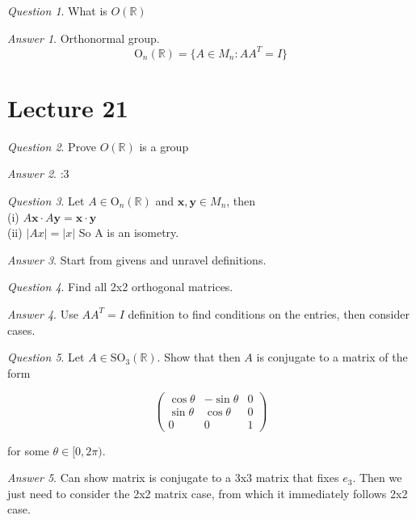 \documentclass[]{article}
\def\bx{\mathbf x}
\def\by{\mathbf y}
\def\reals{\mathbb{R}}
\theoremstyle{remark}
\theoremstyle{qnstyle}
\newtheorem{question}{Question}
\theoremstyle{answerstyle}
\newtheorem*{answer}{Answer}
\begin{document}
\begin{question}
    What is $O(\mathbb{R})$
\end{question}
\begin{answer}
    Orthonormal group. $$\text{O}_n(\mathbb{R}) = \{A \in M_n: A A^T = I\}$$
\end{answer}








\section* {Lecture 21}

\begin{question}
    Prove $O(\mathbb{R})$ is a group
\end{question}
\begin{answer}
    :3
\end{answer}

\begin{question}
    Let $A \in \text{O}_n(\mathbb{R})$ and $\bx, \by \in M_n$, then \\
    (i) $A\bx \cdot A\by = \bx \cdot \by$\\
    (ii) $|Ax| = |x|$
    So A is an isometry.
\end{question}
\begin{answer}
    Start from givens and unravel definitions.
\end{answer}

\begin{question}
    Find all 2x2 orthogonal matrices.
\end{question}
\begin{answer}
    Use $AA^T = I$ definition to find conditions on the entries, then consider cases.
\end{answer}

\begin{question}
    Let $A \in \text{SO}_3(\reals)$. Show that then $A$ is conjugate to a matrix
    of the form

        $$\begin{pmatrix}
            \cos\theta & -\sin\theta & 0 \\
            \sin\theta &  \cos\theta & 0 \\
            0          &  0          & 1
        \end{pmatrix}$$

    for some $\theta \in [0, 2\pi).$ 

\end{question}
\begin{answer}
    Can show matrix is conjugate to a 3x3 matrix that fixes $e_3$.
    Then we just need to consider the 2x2 matrix case, from which it immediately
    follows 2x2 case.
\end{answer}
\end{document}
